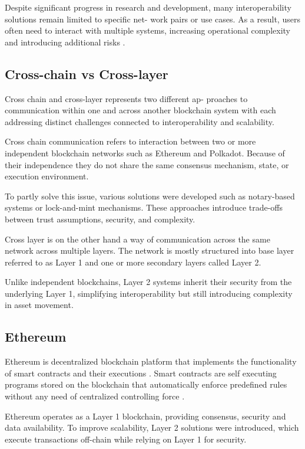 \documentclass[conference]{IEEEtran}
\begin{document}
Despite significant progress in research and development,
many interoperability solutions remain limited to specific net-
work pairs or use cases. As a result, users often need to interact
with multiple systems, increasing operational complexity and
introducing additional risks \cite{mdpi2022, acm2023}.

\subsection{Cross-chain vs Cross-layer}

Cross chain and cross-layer represents two different ap-
proaches to communication within one and across another
blockchain system with each addressing distinct challenges
connected to interoperability and scalability.

Cross chain communication refers to interaction between two or more independent blockchain networks such as Ethereum and Polkadot. Because of their independence they do not share the same consensus mechanism, state, or execution environment.

To partly solve this issue, various solutions were developed such as notary-based systems or lock-and-mint mechanisms. These approaches introduce trade-offs between trust assumptions, security, and complexity.

Cross layer is on the other hand a way of communication across the same network across multiple layers. The network is mostly structured into base layer referred to as Layer 1 and one or more secondary layers called Layer 2.

Unlike independent blockchains, Layer 2 systems inherit their security from the underlying Layer 1, simplifying interoperability but still introducing complexity in asset movement.

\subsection{Ethereum}

Ethereum is decentralized blockchain platform that implements the functionality of smart contracts and their executions \cite{buterin2014, sciencedirect_eth}. Smart contracts are self executing programs stored on the blockchain that automatically enforce predefined rules without any need of centralized controlling force \cite{smartcontracts2022}.

Ethereum operates as a Layer 1 blockchain, providing consensus, security and data availability. To improve scalability, Layer 2 solutions were introduced, which execute transactions off-chain while relying on Layer 1 for security.
\end{document}
